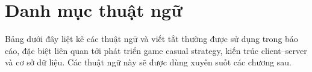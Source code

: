 ﻿\section*{Danh mục thuật ngữ}

\noindent
Bảng dưới đây liệt kê các thuật ngữ và viết tắt thường được sử dụng trong báo cáo, đặc biệt liên quan tới phát triển game casual strategy, kiến trúc client--server và cơ sở dữ liệu. Các thuật ngữ này sẽ được dùng xuyên suốt các chương sau.

\vspace{0.5cm}

\renewcommand{\arraystretch}{1.3}

\setlength{\LTpre}{0pt}
\setlength{\LTpost}{0pt}

\setlength{\emergencystretch}{2em}

